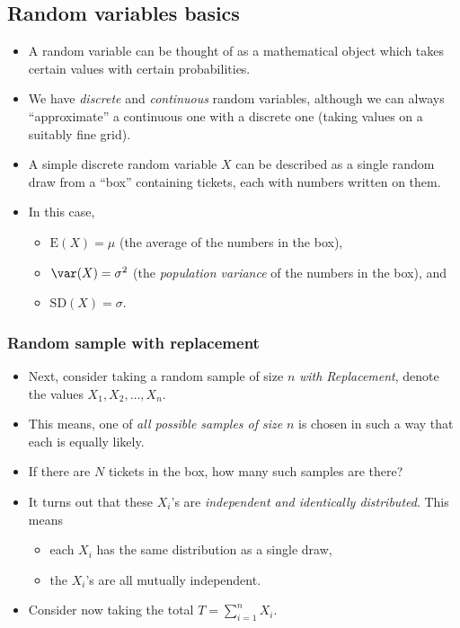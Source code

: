 \documentclass[a4paper]{article}\usepackage[]{graphicx}\usepackage[]{xcolor}
\begin{document}
\subsection{Random variables basics}
\begin{itemize}
	\item A random variable can be thought of as a mathematical object which takes certain values with certain probabilities.
	\item We have \textit{discrete} and \textit{continuous} random variables, although we can always ``approximate'' a continuous one with a discrete one (taking values on a suitably fine grid).
	\item A simple discrete random variable \( X \) can be described as a single random draw from a ``box'' containing tickets, each with numbers written on them.
	\item In this case,
	\begin{itemize}
		\item \( \mathrm{\mathrm{E}}(X) = \mu \) (the average of the numbers in the box),
		\item \( \var (X) = \sigma^2 \) (the \textit{population variance} of the numbers in the box), and
		\item \( \mathrm{SD} (X) = \sigma \).
	\end{itemize}
\end{itemize}
\subsubsection{Random sample with replacement}
\begin{itemize}
	\item Next, consider taking a random sample of size \( n \) \textit{with Replacement}, denote the values \( X_1,X_2,\dotsc,X_n \).
	\item This means, one of \textit{all possible samples of size} \( n \) is chosen in such a way that each is equally likely.
	\item If there are \( N \) tickets in the box, how many such samples are there?
	\item It turns out that these \( X_i \)'s are \textit{independent and identically distributed}. This means
	\begin{itemize}
		\item each \( X_i \) has the same distribution as a single draw,
		\item the \( X_i \)'s are all mutually independent.
	\end{itemize}
	\item Consider now taking the total \( T = \sum_{i=1}^{n} X_i \).
\end{itemize}
\end{document}
